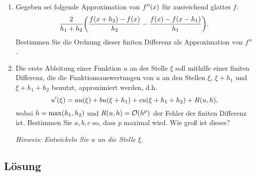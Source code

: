 \documentclass{exercise}
\begin{document}
    \begin{problem}
        \begin{enumerate}
            \item Gegeben sei folgende Approximation von \(f''\parentheses*{x}\) für ausreichend glattes \(f\):
            \[
                \frac{2}{h_1 + h_2}\parentheses*{\frac{f\parentheses*{x + h_2} - f\parentheses*{x}}{h_2} - \frac{f\parentheses*{x} - f\parentheses*{x - h_1}}{h_1}}.
            \]
            Bestimmen Sie die Ordnung dieser finiten Differenz als Approximation von \(f''\).
            \item Die erste Ableitung einer Funktion \(u\) an der Stelle \(\xi\) soll mithilfe einer finiten Differenz, die die Funktionsauswertungen von \(u\) an den Stellen \(\xi\), \(\xi + h_1\) und \(\xi + h_1 + h_2\) benutzt, approximiert werden, d.h.
            \[
                u'\parentheses*{\xi} = au\parentheses*{\xi} + bu\parentheses*{\xi + h_1} + cu\parentheses*{\xi + h_1 + h_2} + R\parentheses*{u, h},
            \]
            wobei \(h = \max\parentheses*{h_1, h_2}\) und \(R\parentheses*{u, h} = \mathcal{O}\parentheses*{h^p}\) der Fehler der finiten Differenz ist.
            Bestimmen Sie \(a, b, c\) so, dass \(p\) maximal wird.
            Wie groß ist dieses?

            \emph{Hinweis: Entwickeln Sie \(u\) un die Stelle \(\xi\).}
        \end{enumerate}
    \end{problem}
    
    \subsection*{Lösung}
\end{document}
